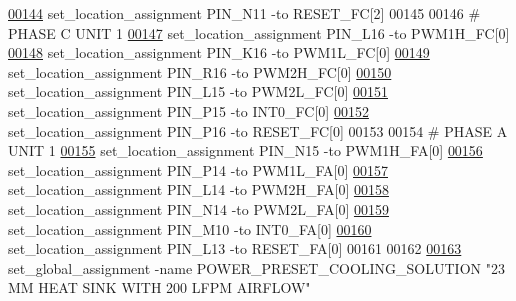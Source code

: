 \begin{DoxyCode}
\hypertarget{_d_e0___n_a_n_o___v_f_8qsf_source_l00144}{}\hyperlink{_d_e0___n_a_n_o___v_f_8qsf_a6ce0d06c0bfa933c3d00a602509ea330}{00144} set\_location\_assignment PIN\_N11 -to RESET\_FC[2]
00145 
00146 \textcolor{keyword}{# PHASE C UNIT 1}
\hypertarget{_d_e0___n_a_n_o___v_f_8qsf_source_l00147}{}\hyperlink{_d_e0___n_a_n_o___v_f_8qsf_a40941c945b3077fc11cde14843ca9671}{00147} set\_location\_assignment PIN\_L16 -to PWM1H\_FC[0]
\hypertarget{_d_e0___n_a_n_o___v_f_8qsf_source_l00148}{}\hyperlink{_d_e0___n_a_n_o___v_f_8qsf_ac67c3621643d5f81c4f8b8a230557c3a}{00148} set\_location\_assignment PIN\_K16 -to PWM1L\_FC[0]
\hypertarget{_d_e0___n_a_n_o___v_f_8qsf_source_l00149}{}\hyperlink{_d_e0___n_a_n_o___v_f_8qsf_ae840c30fbf8533969033cbc5451e633f}{00149} set\_location\_assignment PIN\_R16 -to PWM2H\_FC[0]
\hypertarget{_d_e0___n_a_n_o___v_f_8qsf_source_l00150}{}\hyperlink{_d_e0___n_a_n_o___v_f_8qsf_adc30ca3ce79efdb8385e7e95a333313f}{00150} set\_location\_assignment PIN\_L15 -to PWM2L\_FC[0]
\hypertarget{_d_e0___n_a_n_o___v_f_8qsf_source_l00151}{}\hyperlink{_d_e0___n_a_n_o___v_f_8qsf_a8211c5f2f0afd88dca5e1ae860b8dea2}{00151} set\_location\_assignment PIN\_P15 -to INT0\_FC[0]
\hypertarget{_d_e0___n_a_n_o___v_f_8qsf_source_l00152}{}\hyperlink{_d_e0___n_a_n_o___v_f_8qsf_a0723ac1f697e6dce75df98d1b48c0653}{00152} set\_location\_assignment PIN\_P16 -to RESET\_FC[0]
00153 
00154 \textcolor{keyword}{# PHASE A UNIT 1}
\hypertarget{_d_e0___n_a_n_o___v_f_8qsf_source_l00155}{}\hyperlink{_d_e0___n_a_n_o___v_f_8qsf_adbbedf5e11c70faaa82eb85065e52bc2}{00155} set\_location\_assignment PIN\_N15 -to PWM1H\_FA[0]
\hypertarget{_d_e0___n_a_n_o___v_f_8qsf_source_l00156}{}\hyperlink{_d_e0___n_a_n_o___v_f_8qsf_ae365ebdc7d0a529bad8aa84d391691b5}{00156} set\_location\_assignment PIN\_P14 -to PWM1L\_FA[0]
\hypertarget{_d_e0___n_a_n_o___v_f_8qsf_source_l00157}{}\hyperlink{_d_e0___n_a_n_o___v_f_8qsf_a644a2f2f7513c838419d9594c343cd21}{00157} set\_location\_assignment PIN\_L14 -to PWM2H\_FA[0]
\hypertarget{_d_e0___n_a_n_o___v_f_8qsf_source_l00158}{}\hyperlink{_d_e0___n_a_n_o___v_f_8qsf_a3177755b917e5204e12fa5971fc7d953}{00158} set\_location\_assignment PIN\_N14 -to PWM2L\_FA[0]
\hypertarget{_d_e0___n_a_n_o___v_f_8qsf_source_l00159}{}\hyperlink{_d_e0___n_a_n_o___v_f_8qsf_a653b32309cdbf2a48d93778e3f654c39}{00159} set\_location\_assignment PIN\_M10 -to INT0\_FA[0]
\hypertarget{_d_e0___n_a_n_o___v_f_8qsf_source_l00160}{}\hyperlink{_d_e0___n_a_n_o___v_f_8qsf_a210b7c61b1c3fa00c3fd1d5b618ed2f1}{00160} set\_location\_assignment PIN\_L13 -to RESET\_FA[0]
00161 
00162 
\hypertarget{_d_e0___n_a_n_o___v_f_8qsf_source_l00163}{}\hyperlink{_d_e0___n_a_n_o___v_f_8qsf_aa84732aefdcb2a7e0c581e7a180199f0}{00163} set\_global\_assignment -name POWER\_PRESET\_COOLING\_SOLUTION "23 MM HEAT SINK \textcolor{keywordflow}{WITH} \textcolor{vhdllogic}{200} LFPM AIRFLOW"

\end{DoxyCode}
